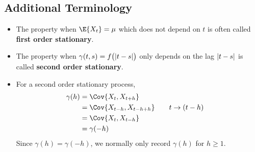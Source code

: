 \subsection*{Additional Terminology}
\begin{itemize}
    \item The property when $ \E{X_t}=\mu $ which does not depend
          on $ t $ is often called \textbf{first order stationary}.
    \item The property when $ \gamma(t,s)=f\bigl(\lvert t-s\rvert\bigr) $
          only depends on the lag $ \lvert t-s\rvert $ is called
          \textbf{second order stationary}.
    \item For a second order stationary process,
          \begin{align*}
              \gamma(h)
               & =\Cov{X_t,X_{t+h}}                                      \\
               & =\Cov{X_{t-h},X_{t-h+h}} & \quad & t\rightarrow{} (t-h) \\
               & =\Cov{X_t,X_{t-h}}                                      \\
               & =\gamma(-h)
          \end{align*}
          Since $ \gamma(h)=\gamma(-h) $, we
          normally only record $ \gamma(h) $ for $ h\ge 1 $.
\end{itemize}
